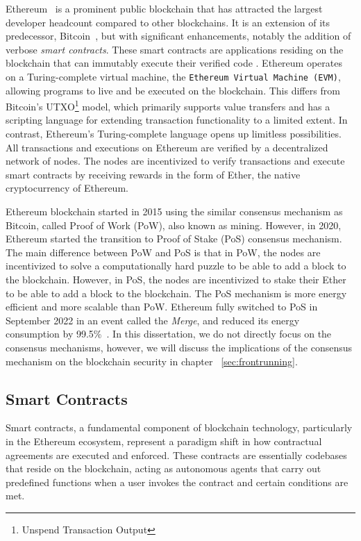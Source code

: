Ethereum~\cite{wood2014ethereum} is a prominent public blockchain that has attracted the largest developer headcount compared to other blockchains. It is an extension of its predecessor, Bitcoin~\cite{nakamoto2008bitcoin}, but with significant enhancements, notably the addition of verbose \textit{smart contracts}. These smart contracts are applications residing on the blockchain that can immutably execute their verified code . Ethereum operates on a Turing-complete virtual machine, the \texttt{Ethereum Virtual Machine (EVM)}, allowing programs to live and be executed on the blockchain. This differs from Bitcoin's UTXO\footnote{Unspend Transaction Output} model, which primarily supports value transfers and has a scripting language for extending transaction functionality to a limited extent. In contrast, Ethereum's Turing-complete language opens up limitless possibilities.  All transactions and executions on Ethereum are verified by a decentralized network of nodes. The nodes are incentivized to verify transactions and execute smart contracts by receiving rewards in the form of Ether, the native cryptocurrency of Ethereum. 

Ethereum blockchain started in 2015 using the similar consensus mechanism as Bitcoin, called Proof of Work (PoW), also known as mining. However, in 2020, Ethereum started the transition to Proof of Stake (PoS) consensus mechanism. The main difference between PoW and PoS is that in PoW, the nodes are incentivized to solve a computationally hard puzzle to be able to add a block to the blockchain. However, in PoS, the nodes are incentivized to stake their Ether to be able to add a block to the blockchain. The PoS mechanism is more energy efficient and more scalable than PoW. Ethereum fully switched to PoS in September 2022 in an event called the \textit{Merge}, and reduced its energy consumption by 99.5\%~\cite{themerge}. In this dissertation, we do not directly focus on the consensus mechanisms, however, we will discuss the implications of the consensus mechanism on the blockchain security in chapter ~\ref{sec:frontrunning}. 


\subsection{Smart Contracts}

Smart contracts, a fundamental component of blockchain technology, particularly in the Ethereum ecosystem, represent a paradigm shift in how contractual agreements are executed and enforced. These contracts are essentially codebases that reside on the blockchain, acting as autonomous agents that carry out predefined functions when a user invokes the contract and certain conditions are met. 

